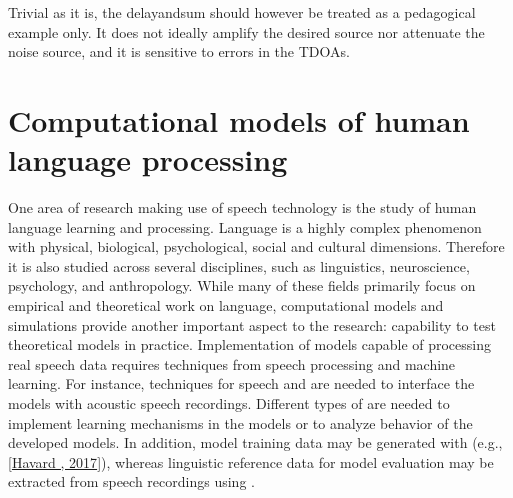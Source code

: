 \documentclass[letterpaper,10pt,english]{jupyterBook}
\begin{document}
\sphinxAtStartPar
Trivial as it is, the delay\sphinxhyphen{}and\sphinxhyphen{}sum should however be treated as a
pedagogical example only. It does not ideally amplify the desired source
nor attenuate the noise source, and it is sensitive to errors in the
TDOAs.

\sphinxAtStartPar
{}

\sphinxstepscope


\chapter{Computational models of human language processing}
\label{\detokenize{Computational_models_of_human_language_processing:computational-models-of-human-language-processing}}\label{\detokenize{Computational_models_of_human_language_processing::doc}}
\sphinxAtStartPar
One area of research making use of speech technology is the study of
human language learning and processing. Language is a highly complex
phenomenon with physical, biological, psychological, social and cultural
dimensions. Therefore it is also studied across several disciplines,
such as linguistics, neuroscience, psychology, and anthropology. While
many of these fields primarily focus on empirical and theoretical work
on language, computational models and simulations provide another
important aspect to the research: capability to test theoretical models
in practice. Implementation of models capable of processing real speech
data requires techniques from speech processing and machine learning.
For instance, techniques for speech
{\hyperref[\detokenize{Representations/Representations::doc}]{}}
and
{\hyperref[\detokenize{Pre-processing::doc}]{}} are needed to interface the models with
acoustic speech recordings. Different types of {\hyperref[\detokenize{Modelling_tools_in_speech_processing::doc}]{}} are needed to
implement learning mechanisms in the models or to analyze behavior of
the developed models. In addition, model training data may be generated
with {\hyperref[\detokenize{Speech_Synthesis::doc}]{}} (e.g., {[}\hyperlink{cite.References:id33}{Havard , 2017}{]}), whereas linguistic reference data for model evaluation may
be extracted from speech recordings using {\hyperref[\detokenize{Recognition/Speech_Recognition::doc}]{}}.
\end{document}

